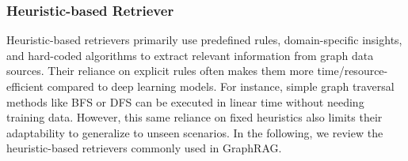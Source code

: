 \begin{table}[t!]
\caption{Categorizing representative retrievers used in GraphRAG.}
\label{tab-retriever}
\end{table}



\subsubsection{Heuristic-based Retriever}
Heuristic-based retrievers primarily use predefined rules, domain-specific insights, and hard-coded algorithms to extract relevant information from graph data sources. Their reliance on explicit rules often makes them more time/resource-efficient compared to deep learning models. For instance, simple graph traversal methods like BFS or DFS can be executed in linear time without needing training data. However, this same reliance on fixed heuristics also limits their adaptability to generalize to unseen scenarios. In the following, we review the heuristic-based retrievers commonly used in GraphRAG.


